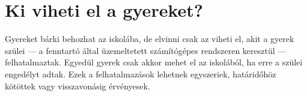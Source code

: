 \hypertarget{ki-viheti-el-a-gyereket}{%
\section{Ki viheti el a gyereket?}\label{ki-viheti-el-a-gyereket}}

Gyereket bárki behozhat az iskolába, de elvinni csak az viheti el, akit
a gyerek szülei --- a fenntartó által üzemeltetett számítógépes
rendszeren keresztül --- felhatalmaztak. Egyedül gyerek csak akkor mehet
el az iskolából, ha erre a szülei engedélyt adtak. Ezek a
felhatalmazások lehetnek egyszeriek, határidőhöz kötöttek vagy
visszavonásig érvényesek.

